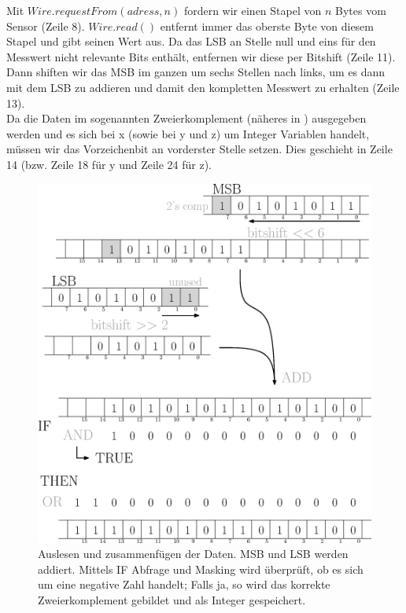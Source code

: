 \documentclass[12pt,a4paper]{scrartcl}
\begin{document}
Mit $Wire.requestFrom(adress, n)$ fordern wir einen Stapel von $n$ Bytes vom Sensor (Zeile 8). $Wire.read()$ entfernt immer das oberste Byte von diesem Stapel und gibt seinen Wert aus. Da das LSB an Stelle null und eins für den Messwert nicht relevante Bits enthält, entfernen wir diese per Bitshift (Zeile 11). Dann shiften wir das MSB im ganzen um sechs Stellen nach links, um es dann mit dem LSB zu addieren und damit den kompletten Messwert zu erhalten (Zeile 13).\\

Da die Daten im sogenannten Zweierkomplement (näheres in \citep{Tietze:2002fk}) ausgegeben werden und es sich bei x (sowie bei y und z) um Integer Variablen handelt, müssen wir das Vorzeichenbit an vorderster Stelle setzen. Dies geschieht in Zeile 14 (bzw. Zeile 18 für y und Zeile 24 für z).\\



\begin{figure}[H]
\centering
\includegraphics[scale=.55]{auslesen.eps}
\caption{Auslesen und zusammenfügen der Daten. MSB und LSB werden addiert. Mittels IF Abfrage und Masking wird überprüft, ob es sich um eine negative Zahl handelt; Falls ja, so wird das korrekte Zweierkomplement gebildet und als Integer gespeichert.}
\label{auslesen}
\end{figure}
\end{document}
